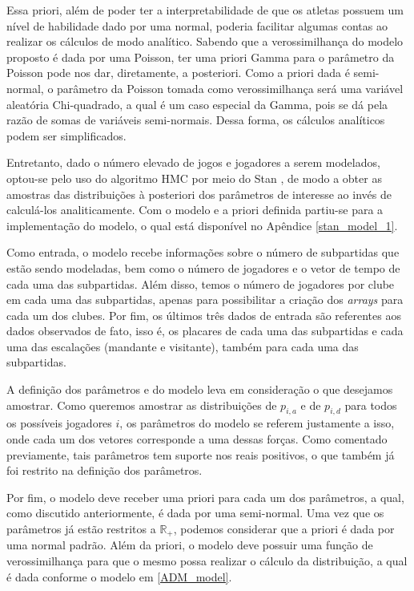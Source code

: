 Essa priori, além de poder ter a interpretabilidade de que os atletas possuem um nível de habilidade dado por uma normal, poderia facilitar algumas contas ao realizar os cálculos de modo analítico. Sabendo que a verossimilhança do modelo proposto é dada por uma Poisson, ter uma priori Gamma para o parâmetro da Poisson pode nos dar, diretamente, a posteriori. Como a priori dada é semi-normal, o parâmetro da Poisson tomada como verossimilhança será uma variável aleatória Chi-quadrado, a qual é um caso especial da Gamma, pois se dá pela razão de somas de variáveis semi-normais. Dessa forma, os cálculos analíticos podem ser simplificados.

Entretanto, dado o número elevado de jogos e jogadores a serem modelados, optou-se pelo uso do algoritmo HMC por meio do Stan \cite{stan}, de modo a obter as amostras das distribuições à posteriori dos parâmetros de interesse ao invés de calculá-los analiticamente. Com o modelo e a priori definida partiu-se para a implementação do modelo, o qual está disponível no Apêndice \ref{stan_model_1}.

Como entrada, o modelo recebe informações sobre o número de subpartidas que estão sendo modeladas, bem como o número de jogadores e o vetor de tempo de cada uma das subpartidas. Além disso, temos o número de jogadores por clube em cada uma das subpartidas, apenas para possibilitar a criação dos \textit{arrays} para cada um dos clubes. Por fim, os últimos três dados de entrada são referentes aos dados observados de fato, isso é, os placares de cada uma das subpartidas e cada uma das escalações (mandante e visitante), também para cada uma das subpartidas.

A definição dos parâmetros e do modelo leva em consideração o que desejamos amostrar. Como queremos amostrar as distribuições de $p_{i, a}$ e de $p_{i,d}$ para todos os possíveis jogadores $i$, os parâmetros do modelo se referem justamente a isso, onde cada um dos vetores corresponde a uma dessas forças. Como comentado previamente, tais parâmetros tem suporte nos reais positivos, o que também já foi restrito na definição dos parâmetros.

Por fim, o modelo deve receber uma priori para cada um dos parâmetros, a qual, como discutido anteriormente, é dada por uma semi-normal. Uma vez que os parâmetros já estão restritos a $\mathds{R}_+$, podemos considerar que a priori é dada por uma normal padrão. Além da priori, o modelo deve possuir uma função de verossimilhança para que o mesmo possa realizar o cálculo da distribuição, a qual é dada conforme o modelo em \ref{ADM_model}.

